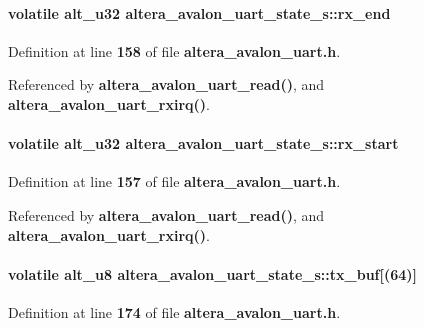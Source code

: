 \paragraph[{rx\+\_\+end}]{\setlength{\rightskip}{0pt plus 5cm}volatile {\bf alt\+\_\+u32} altera\+\_\+avalon\+\_\+uart\+\_\+state\+\_\+s\+::rx\+\_\+end}\label{structaltera__avalon__uart__state__s_a10fff6b517575823b68d14d340a15a78}


Definition at line {\bf 158} of file {\bf altera\+\_\+avalon\+\_\+uart.\+h}.



Referenced by {\bf altera\+\_\+avalon\+\_\+uart\+\_\+read()}, and {\bf altera\+\_\+avalon\+\_\+uart\+\_\+rxirq()}.

\paragraph[{rx\+\_\+start}]{\setlength{\rightskip}{0pt plus 5cm}volatile {\bf alt\+\_\+u32} altera\+\_\+avalon\+\_\+uart\+\_\+state\+\_\+s\+::rx\+\_\+start}\label{structaltera__avalon__uart__state__s_ac56a2f79f5ab58839705f8bdc1566c74}


Definition at line {\bf 157} of file {\bf altera\+\_\+avalon\+\_\+uart.\+h}.



Referenced by {\bf altera\+\_\+avalon\+\_\+uart\+\_\+read()}, and {\bf altera\+\_\+avalon\+\_\+uart\+\_\+rxirq()}.

\paragraph[{tx\+\_\+buf}]{\setlength{\rightskip}{0pt plus 5cm}volatile {\bf alt\+\_\+u8} altera\+\_\+avalon\+\_\+uart\+\_\+state\+\_\+s\+::tx\+\_\+buf[(64)]}\label{structaltera__avalon__uart__state__s_a84ef15b6f2c6f769b95a71160537a12a}


Definition at line {\bf 174} of file {\bf altera\+\_\+avalon\+\_\+uart.\+h}.



